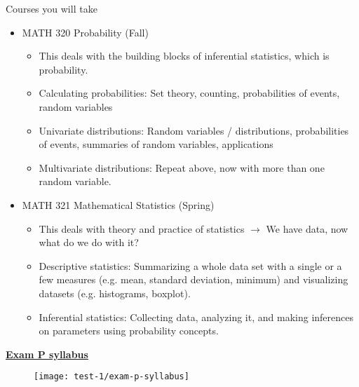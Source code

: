 \documentclass{article}
\newcommand{\bu}[1]{\textbf{\ul{#1}}}	%
\begin{document}
Courses you will take\bigskip
\begin{itemize}
    \item MATH 320 Probability (Fall)
    \begin{itemize}
        \item This deals with the building blocks of inferential statistics, which is probability.
        \item Calculating probabilities: Set theory, counting, probabilities of events, random variables
        \item Univariate distributions: Random variables / distributions, probabilities of events, summaries of random variables, applications
        \item Multivariate distributions: Repeat above, now with more than one random variable.
    \end{itemize}\bigskip
    \item MATH 321 Mathematical Statistics (Spring)
    \begin{itemize}
        \item This deals with theory and practice of statistics $\rightarrow$ We have data, now what do we do with it?
        \item Descriptive statistics: Summarizing a whole data set with a single or a few measures (e.g. mean, standard deviation, minimum) and visualizing datasets (e.g. histograms, boxplot).
        \item Inferential statistics: Collecting data, analyzing it, and making inferences on parameters using probability concepts.
    \end{itemize}
\end{itemize}\bigskip

\vspace{15pt}

\bu{Exam P syllabus}

\begin{figure}[H]
    \center\texttt{[image: test-1/exam-p-syllabus]}
\end{figure}
\end{document}
